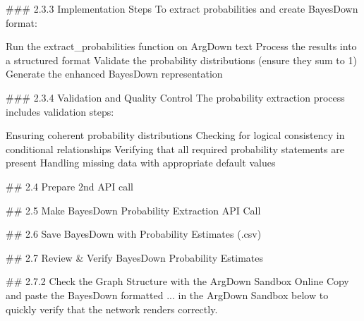 \documentclass[
  11pt,
  letterpaper,
]{book}
\newenvironment{Shaded}{\begin{snugshade}}{\end{snugshade}}
\newcommand{\ErrorTok}[1]{\textcolor[rgb]{0.68,0.00,0.00}{#1}}
\begin{document}
\begin{Shaded}
\begin{Highlighting}[]
\ErrorTok{\#\#\#} \ErrorTok{2.3.3} \ErrorTok{Implementation} \ErrorTok{Steps}
\ErrorTok{To} \ErrorTok{extract} \ErrorTok{probabilities} \ErrorTok{and} \ErrorTok{create} \ErrorTok{BayesDown} \ErrorTok{format:}

\ErrorTok{Run} \ErrorTok{the} \ErrorTok{extract\_probabilities} \ErrorTok{function} \ErrorTok{on} \ErrorTok{ArgDown} \ErrorTok{text}
\ErrorTok{Process} \ErrorTok{the} \ErrorTok{results} \ErrorTok{into} \ErrorTok{a} \ErrorTok{structured} \ErrorTok{format}
\ErrorTok{Validate} \ErrorTok{the} \ErrorTok{probability} \ErrorTok{distributions} \ErrorTok{(ensure} \ErrorTok{they} \ErrorTok{sum} \ErrorTok{to} \ErrorTok{1)}
\ErrorTok{Generate} \ErrorTok{the} \ErrorTok{enhanced} \ErrorTok{BayesDown} \ErrorTok{representation}

\ErrorTok{\#\#\#} \ErrorTok{2.3.4} \ErrorTok{Validation} \ErrorTok{and} \ErrorTok{Quality} \ErrorTok{Control}
\ErrorTok{The} \ErrorTok{probability} \ErrorTok{extraction} \ErrorTok{process} \ErrorTok{includes} \ErrorTok{validation} \ErrorTok{steps:}

\ErrorTok{Ensuring} \ErrorTok{coherent} \ErrorTok{probability} \ErrorTok{distributions}
\ErrorTok{Checking} \ErrorTok{for} \ErrorTok{logical} \ErrorTok{consistency} \ErrorTok{in} \ErrorTok{conditional} \ErrorTok{relationships}
\ErrorTok{Verifying} \ErrorTok{that} \ErrorTok{all} \ErrorTok{required} \ErrorTok{probability} \ErrorTok{statements} \ErrorTok{are} \ErrorTok{present}
\ErrorTok{Handling} \ErrorTok{missing} \ErrorTok{data} \ErrorTok{with} \ErrorTok{appropriate} \ErrorTok{default} \ErrorTok{values}

\ErrorTok{\#\#} \ErrorTok{2.4} \ErrorTok{Prepare} \ErrorTok{2nd} \ErrorTok{API} \ErrorTok{call}

\ErrorTok{\#\#} \ErrorTok{2.5} \ErrorTok{Make} \ErrorTok{BayesDown} \ErrorTok{Probability} \ErrorTok{Extraction} \ErrorTok{API} \ErrorTok{Call}

\ErrorTok{\#\#} \ErrorTok{2.6} \ErrorTok{Save} \ErrorTok{BayesDown} \ErrorTok{with} \ErrorTok{Probability} \ErrorTok{Estimates} \ErrorTok{(.csv)}

\ErrorTok{\#\#} \ErrorTok{2.7} \ErrorTok{Review} \ErrorTok{\&} \ErrorTok{Verify} \ErrorTok{BayesDown} \ErrorTok{Probability} \ErrorTok{Estimates}

\ErrorTok{\#\#} \ErrorTok{2.7.2} \ErrorTok{Check} \ErrorTok{the} \ErrorTok{Graph} \ErrorTok{Structure} \ErrorTok{with} \ErrorTok{the} \ErrorTok{ArgDown} \ErrorTok{Sandbox} \ErrorTok{Online}
\ErrorTok{Copy} \ErrorTok{and} \ErrorTok{paste} \ErrorTok{the} \ErrorTok{BayesDown} \ErrorTok{formatted} \ErrorTok{...} \ErrorTok{in} \ErrorTok{the} \ErrorTok{ArgDown} \ErrorTok{Sandbox} \ErrorTok{below} \ErrorTok{to} \ErrorTok{quickly} \ErrorTok{verify} \ErrorTok{that} \ErrorTok{the} \ErrorTok{network} \ErrorTok{renders} \ErrorTok{correctly.}


\end{Highlighting}
\end{Shaded}
\end{document}
